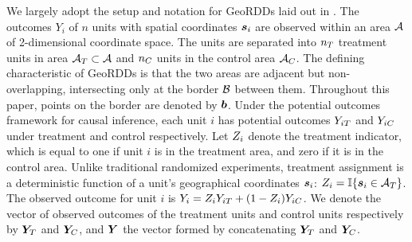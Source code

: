 We largely adopt the setup and notation for GeoRDDs laid out in \citet{keele_titiunik_2015}.
The outcomes \(Y_i\) of \(n\) units with spatial coordinates \(\bm{s}_i\) are observed within an area \(\mathcal{A}\) of 2-dimensional coordinate space.
The units are separated into \(n_T\) treatment units in area \(\mathcal{A}{}_{T} \subset \mathcal{A}\)
and \(n_C\) units in the control area \(\mathcal{A}{}_{C}\).
The defining characteristic of GeoRDDs is that the two areas are adjacent but non-overlapping, intersecting only at the border \(\mathcal{B}\) between them.
Throughout this paper, points on the border are denoted by \(\bm{b}\).
Under the potential outcomes framework for causal inference, each unit \(i\) has potential outcomes \(Y_{iT}\) and \(Y_{iC}\) under treatment and control respectively.
Let \(Z_i\) denote the treatment indicator, which is equal to one if unit \(i\) is in the treatment area, and zero if it is in the control area.
Unlike traditional randomized experiments, treatment assignment is a deterministic function of a unit's geographical coordinates \(\bm{s}_i\): \(\treatind_i = \Ind\cbr{\svec_i \in \treatarea}\).
The observed outcome for unit \(i\) is \(Y_i = Z_i Y_{iT} + (1 - Z_i) Y_{iC}\).
We denote the vector of observed outcomes of the treatment units and control units respectively by \(\bm{Y}_{T}\) and \(\bm{Y}_{C}\), and \(\bm{Y}\) the vector formed by concatenating \(\bm{Y}_{T}\) and \(\bm{Y}_{C}\).

